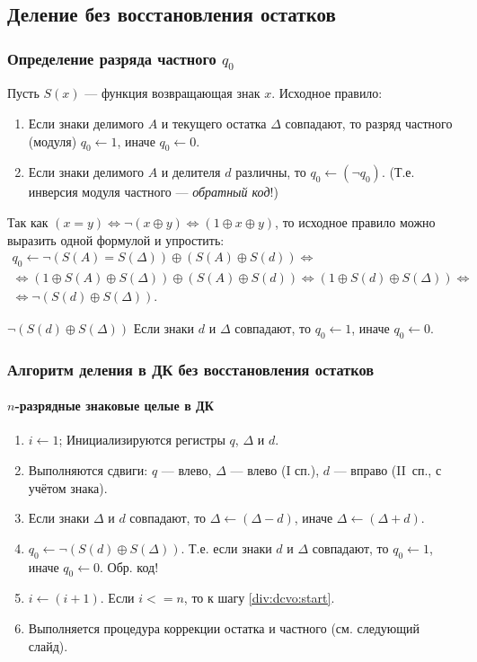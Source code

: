 \subsection{Деление без восстановления остатков}

\begin{frame}
    \frametitle{Определение разряда частного $q_0$}

    Пусть $S(x)$ --- функция возвращающая знак $x$. Исходное правило:
    \begin{enumerate}
        \item Если знаки делимого $A$ и текущего остатка $\Delta$ совпадают, то разряд частного (модуля) $q_0\gets 1$, иначе $q_0\gets 0$.
        \item Если знаки делимого $A$ и делителя $d$ различны, то $q_0\gets (\lnot q_0)$. (Т.е. инверсия модуля частного --- \emph{обратный код}!)
    \end{enumerate}
    
    
    Так как $(x=y)\Leftrightarrow \lnot(x\oplus y) \Leftrightarrow (1\oplus x\oplus y)$,
    то исходное правило можно выразить одной формулой и упростить:
    \begin{align*}
        q_0\gets \lnot(S(A)=S(\Delta))\oplus(S(A)\oplus S(d)) \Leftrightarrow \\
        \Leftrightarrow(1\oplus S(A)\oplus S(\Delta))\oplus (S(A)\oplus S(d)) \Leftrightarrow (1\oplus S(d)\oplus S(\Delta))\Leftrightarrow \\
        \Leftrightarrow\lnot(S(d)\oplus S(\Delta)).
    \end{align*}
    \begin{block}{$\lnot(S(d)\oplus S(\Delta))$}
        Если знаки $d$ и $\Delta$ совпадают, то $q_0\gets 1$, иначе $q_0\gets 0$.
    \end{block}
\end{frame}

\begin{frame}
    \frametitle{Алгоритм деления в ДК без восстановления остатков}
    \framesubtitle{$n$-разрядные знаковые целые в ДК}

    \begin{enumerate}
        \item $i\gets 1$; Инициализируются регистры $q$, $\Delta$ и $d$.
        \item\label{div:dcvo:start} Выполняются сдвиги: $q$ --- влево, $\Delta$ --- влево (I сп.), $d$ --- вправо (II~сп., с учётом знака).
        \item Если знаки $\Delta$ и $d$ совпадают, то $\Delta\gets(\Delta - d)$, иначе $\Delta\gets(\Delta + d)$.
        \item $q_0\gets\lnot(S(d)\oplus S(\Delta))$. Т.е. если знаки $d$ и $\Delta$ совпадают, то $q_0\gets 1$, иначе $q_0\gets 0$. Обр. код!
        \item $i\gets (i + 1)$. Если $i<=n$, то к шагу \ref{div:dcvo:start}.
        \item Выполняется процедура коррекции остатка и частного (см. следующий слайд).
    \end{enumerate}
\end{frame}

